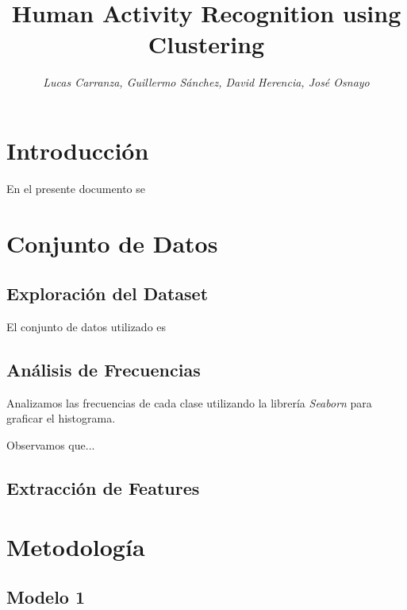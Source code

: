 \documentclass[conference]{IEEEtran}
\begin{document}
    \title{Human Activity Recognition using Clustering\\}

    \author{\textit{Lucas Carranza, Guillermo Sánchez, David Herencia, José Osnayo}}
\maketitle

\section{Introducción}
En el presente documento se 

\section{Conjunto de Datos}
\subsection{Exploración del Dataset}
El conjunto de datos utilizado es

\subsection{Análisis de Frecuencias}

Analizamos las frecuencias de cada clase utilizando la librería \textit{Seaborn} para graficar el histograma.
\begin{comment}
\begin{figure}
    \centering
    \texttt{[image: class\_freq.png]}
    \caption{Histograma de Frecuencias de Clases}
    \label{fig1}
\end{figure}
\end{comment}

Observamos que...

\subsection{Extracción de Features}

\section{Metodología}

\subsection{Modelo 1}
\end{document}
